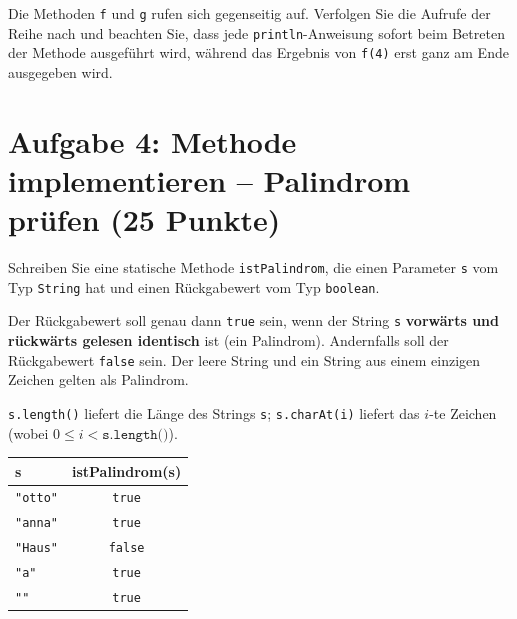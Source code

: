 \documentclass[
	fontsize=12pt,
	paper=a4,
	numbers=noenddot,
	parskip=half,
	openany
]{scrbook}
\begin{document}
\begin{hinweis}[Empfehlung]
	Die Methoden \texttt{f} und \texttt{g} rufen sich gegenseitig auf. Verfolgen Sie die Aufrufe der Reihe nach und beachten Sie, dass jede \texttt{println}-Anweisung sofort beim Betreten der Methode ausgeführt wird, während das Ergebnis von \texttt{f(4)} erst ganz am Ende ausgegeben wird.
\end{hinweis}

\clearpage
\section*{Aufgabe 4: Methode implementieren -- Palindrom prüfen \hfill (25 Punkte)}

Schreiben Sie eine statische Methode \texttt{istPalindrom}, die einen Parameter \texttt{s} vom Typ \texttt{String} hat und einen Rückgabewert vom Typ \texttt{boolean}.

Der Rückgabewert soll genau dann \texttt{true} sein, wenn der String \texttt{s} \textbf{vorwärts und rückwärts gelesen identisch} ist (ein Palindrom). Andernfalls soll der Rückgabewert \texttt{false} sein. Der leere String und ein String aus einem einzigen Zeichen gelten als Palindrom.

\begin{hinweis}[Hinweise]
	\texttt{s.length()} liefert die Länge des Strings \texttt{s}; \texttt{s.charAt(i)} liefert das $i$-te Zeichen (wobei $0 \le i < \texttt{s.length()}$).
\end{hinweis}

\begin{center}
\begin{tabular}{l c}
	\toprule
	\textbf{s} & \textbf{istPalindrom(s)} \\
	\midrule
	\lstinline!"otto"! & \texttt{true} \\
	\lstinline!"anna"! & \texttt{true} \\
	\lstinline!"Haus"! & \texttt{false} \\
	\lstinline!"a"!    & \texttt{true} \\
	\lstinline!""!     & \texttt{true} \\
	\bottomrule
\end{tabular}
\end{center}
\end{document}
